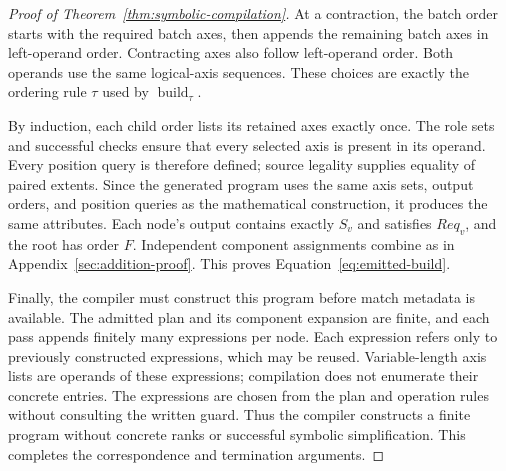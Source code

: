 \begin{proof}[Proof of Theorem~\ref{thm:symbolic-compilation}]
At a contraction, the batch order starts with the required batch axes,
then appends the remaining batch axes in left-operand order. Contracting
axes also follow left-operand order. Both operands use the same logical-axis
sequences. These choices are exactly the ordering rule $\tau$ used by
$\operatorname{build}_{\tau}$.

By induction, each child order lists its retained axes exactly once.
The role sets and successful checks ensure that every selected axis is
present in its operand. Every position query is therefore defined;
source legality supplies equality of paired extents. Since the generated
program uses the same axis sets, output orders, and position queries as the
mathematical construction, it produces the same attributes. Each node's
output contains exactly $S_v$ and satisfies $Req_v$, and the root has order
$F$. Independent component assignments combine as in
Appendix~\ref{sec:addition-proof}. This proves Equation~\eqref{eq:emitted-build}.

Finally, the compiler must construct this program before match metadata
is available. The admitted plan and its component expansion are finite,
and each pass appends finitely many expressions per node. Each expression
refers only to previously constructed expressions, which may be reused.
Variable-length axis lists are operands of these expressions; compilation
does not enumerate their concrete entries. The expressions are chosen from
the plan and operation rules without consulting the written guard. Thus
the compiler constructs a finite program without concrete ranks or
successful symbolic simplification. This completes the correspondence
and termination arguments.
\end{proof}

